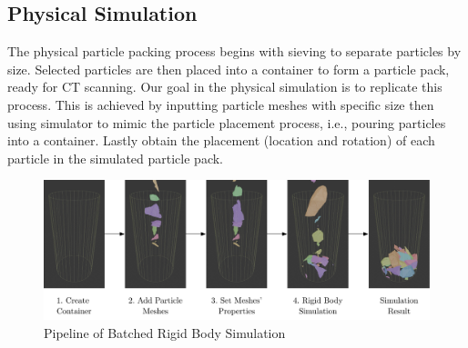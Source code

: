\documentclass[preprint,12pt]{elsarticle}
\begin{document}
\subsection{Physical Simulation}
The physical particle packing process begins with sieving to separate particles by size. 
Selected particles are then placed into a container to form a particle pack, ready for CT scanning.
Our goal in the physical simulation is to replicate this process.
This is achieved by inputting particle meshes with specific size then using simulator to mimic the particle placement process, i.e., pouring particles into a container. 
Lastly obtain the placement (location and rotation) of each particle in the simulated particle pack.
\begin{figure}[H]
    \includegraphics[width=\textwidth]{figures/pdf/simulation-pipeline.pdf}
    \caption{Pipeline of Batched Rigid Body Simulation}
    \label{fig:batched_rigid_body_simulation_pipeline}
\end{figure}
\par
\end{document}
